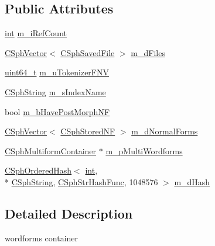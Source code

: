 \subsection*{Public Attributes}
\begin{DoxyCompactItemize}
\item 
\hyperlink{sphinxexpr_8cpp_a4a26e8f9cb8b736e0c4cbf4d16de985e}{int} \hyperlink{structCSphWordforms_adf2448280ec7d206e8842f73297ea3fa}{m\-\_\-i\-Ref\-Count}
\item 
\hyperlink{classCSphVector}{C\-Sph\-Vector}$<$ \hyperlink{structCSphSavedFile}{C\-Sph\-Saved\-File} $>$ \hyperlink{structCSphWordforms_a03a149f24d41183edc2168849bf7e403}{m\-\_\-d\-Files}
\item 
\hyperlink{sphinxstd_8h_aaa5d1cd013383c889537491c3cfd9aad}{uint64\-\_\-t} \hyperlink{structCSphWordforms_a02ddb5542979b4c66f3c1708506ef607}{m\-\_\-u\-Tokenizer\-F\-N\-V}
\item 
\hyperlink{structCSphString}{C\-Sph\-String} \hyperlink{structCSphWordforms_a69571fccf4ebb86c4c1d61e6b1af4837}{m\-\_\-s\-Index\-Name}
\item 
bool \hyperlink{structCSphWordforms_a3b1d584e1d49232758eb155fc7543fa0}{m\-\_\-b\-Have\-Post\-Morph\-N\-F}
\item 
\hyperlink{classCSphVector}{C\-Sph\-Vector}$<$ \hyperlink{structCSphStoredNF}{C\-Sph\-Stored\-N\-F} $>$ \hyperlink{structCSphWordforms_a1284ff1cd78f8be9b7a059ea33c60fc9}{m\-\_\-d\-Normal\-Forms}
\item 
\hyperlink{structCSphMultiformContainer}{C\-Sph\-Multiform\-Container} $\ast$ \hyperlink{structCSphWordforms_a5f8c7e4b43c2ae7a56be30b2fa4bee83}{m\-\_\-p\-Multi\-Wordforms}
\item 
\hyperlink{classCSphOrderedHash}{C\-Sph\-Ordered\-Hash}$<$ \hyperlink{sphinxexpr_8cpp_a4a26e8f9cb8b736e0c4cbf4d16de985e}{int}, \\*
\hyperlink{structCSphString}{C\-Sph\-String}, \hyperlink{structCSphStrHashFunc}{C\-Sph\-Str\-Hash\-Func}, 1048576 $>$ \hyperlink{structCSphWordforms_a0c10458062525eb7bffa2034531b3a5e}{m\-\_\-d\-Hash}
\end{DoxyCompactItemize}


\subsection{Detailed Description}
wordforms container 


